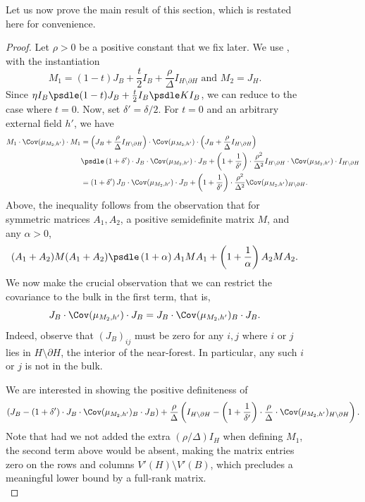 \documentclass[11pt,letterpaper]{article}
\begin{document}
\begin{figure}
    Let us now prove the main result of this section, which is restated here for convenience.
    \entropyconservation*
    \begin{proof}
        Let $\rho > 0$ be a positive constant that we fix later.
        We use , with the instantiation
        \[ M_1 = (1-t) J_B + \frac{t}{2}I_B +  \frac{\rho}{\Delta} I_{H \setminus \partial H} \text{ and } M_2 = J_H. \]
        Since $\eta I_B \psdle (1-t) J_B + \frac{t}{2}I_B \psdle K I_B$, we can reduce to the case where $t=0$.
        Now, set $\delta' = \delta/2$.
        For $t=0$ and an arbitrary external field $h'$, we have
        \begin{align*}
            M_1 \cdot \Cov(\mu_{M_2,h'}) \cdot M_1 &= \left( J_B + \frac{\rho}{\Delta} I_{H \setminus \partial H} \right) \cdot \Cov(\mu_{M_2,h'}) \cdot \left( J_B + \frac{\rho}{\Delta} I_{H \setminus \partial H} \right) \\
                &\psdle \left( 1 + \delta' \right) \cdot J_B \cdot \Cov(\mu_{M_2,h'}) \cdot J_B + \left( 1 + \frac{1}{\delta'} \right) \cdot \frac{\rho^2}{\Delta^2} I_{H \setminus \partial H} \cdot \Cov(\mu_{M_2,h'}) \cdot I_{H \setminus \partial H} \\
                &= \left(1 + \delta'\right) J_B \cdot \Cov(\mu_{M_2,h'}) \cdot J_B + \left(1 + \frac{1}{\delta'}\right) \cdot \frac{\rho^2}{\Delta^2} \Cov(\mu_{M_2,h'})_{H \setminus \partial H}.
        \end{align*}
        Above, the inequality follows from the observation that for symmetric matrices $A_1,A_2$, a positive semidefinite matrix $M$, and any $\alpha > 0$,
        \[ (A_1 + A_2) M (A_1 + A_2) \psdle \left(1+\alpha\right) A_1 M A_1 + \left(1 + \frac{1}{\alpha}\right) A_2 M A_2. \]
        We now make the crucial observation that we can restrict the covariance to the bulk in the first term, that is, 
        \[ J_B \cdot \Cov(\mu_{M_2,h'}) \cdot J_B = J_B \cdot \Cov(\mu_{M_2,h'})_B \cdot J_B. \]
        Indeed, observe that $(J_B)_{ij}$ must be zero for any $i,j$ where $i$ or $j$ lies in $H \setminus \partial H$, the interior of the near-forest. In particular, any such $i$ or $j$ is not in the bulk.

        We are interested in showing the positive definiteness of
        \[ 
            \left(J_B - (1+\delta') \cdot J_B \cdot \Cov(\mu_{M_2,h'})_B \cdot J_B\right) + \frac{\rho}{\Delta}\left( I_{H \setminus \partial H} - \left( 1 + \frac{1}{\delta'}\right) \cdot \frac{\rho}{\Delta} \cdot \Cov(\mu_{M_2,h'})_{H \setminus \partial H} \right). 
        \]
        Note that had we not added the extra $(\rho/\Delta) I_H$ when defining $M_1$, the second term above would be absent, making the matrix entries zero on the rows and columns $V'(H) \setminus V'(B)$, which precludes a meaningful lower bound by a full-rank matrix.\\


\end{proof}
\end{figure}
\end{document}
